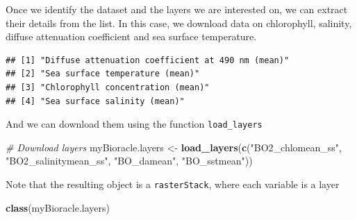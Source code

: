 \documentclass[
]{book}
\newenvironment{Shaded}{\begin{snugshade}}{\end{snugshade}}
\newcommand{\CommentTok}[1]{\textcolor[rgb]{0.56,0.35,0.01}{\textit{#1}}}
\newcommand{\FunctionTok}[1]{\textcolor[rgb]{0.13,0.29,0.53}{\textbf{#1}}}
\newcommand{\NormalTok}[1]{#1}
\newcommand{\OtherTok}[1]{\textcolor[rgb]{0.56,0.35,0.01}{#1}}
\newcommand{\SpecialCharTok}[1]{\textcolor[rgb]{0.81,0.36,0.00}{\textbf{#1}}}
\newcommand{\StringTok}[1]{\textcolor[rgb]{0.31,0.60,0.02}{#1}}
\begin{document}
Once we identify the dataset and the layers we are interested on, we can extract their details from the list. In this case, we download data on chlorophyll, salinity, diffuse attenuation coefficient and sea surface temperature.

\begin{Shaded}
\end{Shaded}

\begin{verbatim}
## [1] "Diffuse attenuation coefficient at 490 nm (mean)"
## [2] "Sea surface temperature (mean)"                  
## [3] "Chlorophyll concentration (mean)"                
## [4] "Sea surface salinity (mean)"
\end{verbatim}

And we can download them using the function \texttt{load\_layers}

\begin{Shaded}
\begin{Highlighting}[]
\CommentTok{\# Download layers}
\NormalTok{myBioracle.layers }\OtherTok{\textless{}{-}} \FunctionTok{load\_layers}\NormalTok{(}\FunctionTok{c}\NormalTok{(}\StringTok{"BO2\_chlomean\_ss"}\NormalTok{,}
    \StringTok{"BO2\_salinitymean\_ss"}\NormalTok{, }\StringTok{"BO\_damean"}\NormalTok{, }\StringTok{"BO\_sstmean"}\NormalTok{))}
\end{Highlighting}
\end{Shaded}

Note that the resulting object is a \texttt{rasterStack}, where each variable is a layer

\begin{Shaded}
\begin{Highlighting}[]
\FunctionTok{class}\NormalTok{(myBioracle.layers)}
\end{Highlighting}
\end{Shaded}
\end{document}
